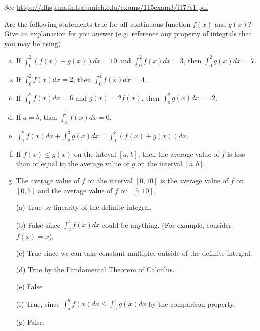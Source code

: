 \documentclass[11pt]{exam}
\begin{document}
\begin{questions}
\begin{solution}
  See \href{https://dhsp.math.lsa.umich.edu/exams/115exam3/f17/s1.pdf}{https://dhsp.math.lsa.umich.edu/exams/115exam3/f17/s1.pdf}
\end{solution}
\pagebreak
\question Are the following statements true for all continuous function $f(x)$ and $g(x)$? Give an explanation for you answer (e.g. reference any property of integrals that you may be using). 
\begin{enumerate}[(a)]
\item If $\int_{0}^2 (f(x)+g(x))dx = 10$ and $\int_{0}^2 f(x) dx = 3$, then $\int_{0}^2 g(x) dx$ = 7. 
\item If $\int_{0}^2 f(x) dx = 2$, then $\int_{0}^4 f(x) dx$ = 4. 
\item If $\int_0^2 f(x) dx = 6 $ and $g(x) = 2 f(x)$, then $\int_0^2 g(x) dx = 12$.
\item If $a=b$, then $\int_{a}^{b}f(x) dx = 0$. 
\item $\int_1^2 f(x)dx + \int_2^3 g(x) dx = \int_1^3 (f(x) + g(x)) dx.$  
\item If $f(x) \leq g(x)$ on the inteval $[a,b]$, then the average value of $f$ is less than or equal to the average value of $g$ on the interval $[a,b]$. 
\item The average value of $f$ on the interval $[0,10]$ is the average value of $f$ on $[0,5]$ and the average value of $f$ on $[5,10]$. 
\end{enumerate}
\begin{solution}
  \begin{enumerate}
  \item[(a)] True by linearity of the definite integral.
  \item[(b)] False since \(\int_2^4 f(x) dx\) could be
    anything. (For example, consider \(f(x) = x\)). 
  \item[(c)] True since we can take constant multiples outside of the
    definite integral.
  \item[(d)] True by the Fundamental Theorem of Calculus.
  \item[(e)] False
  \item[(f)] True, since \(\int_a^b f(x) dx \leq \int_a^b g(x) dx\) by
    the comparison property.
  \item[(g)] False. 

\end{enumerate}
\end{solution}
\end{questions}
\end{document}
